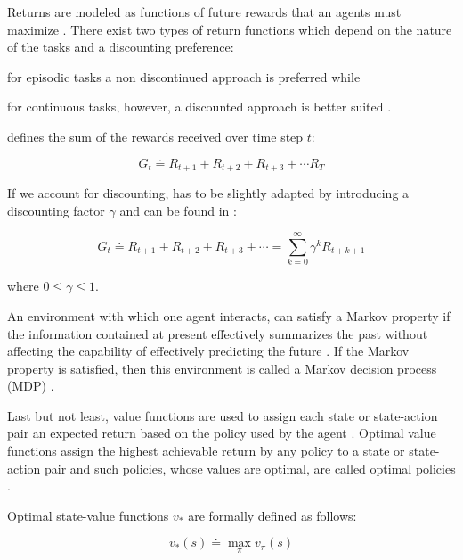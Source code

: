 \documentclass{seal_thesis}
\begin{document}
Returns are modeled as functions of future rewards that an agents must maximize \cite[p. 73]{Sutton2017}. There exist two types of return functions which depend on the nature of the tasks and a discounting preference:
\begin{enumerate*}
	\item for episodic tasks a non discontinued approach is preferred while
	\item for continuous tasks, however, a discounted approach is better suited \cite[p. 73]{Sutton2017}.
\end{enumerate*}

 defines the sum of the rewards received over time step $t$:

\begin{equation}
\label{eq:expected_return}
	G_t  \doteq R_{t+1} + R_{t+2} + R_{t+3} + \cdots R_{T}
\end{equation}

If we account for discounting,  has to be slightly adapted by introducing a discounting factor $\gamma$ and can be found in :

\begin{equation}
\label{eq:expected_discounted_return}
	G_t  \doteq R_{t+1} + R_{t+2} + R_{t+3} + \cdots = \sum_{k=0}^\infty \gamma^k R_{t+k+1}
\end{equation}

where $0 \leq \gamma \leq 1$.

An environment  with which one agent interacts, can satisfy a Markov property if the information contained at present effectively summarizes the past without affecting the capability of effectively predicting the future \cite[p. 73]{Sutton2017}. If the Markov property is satisfied, then this environment is called a Markov decision process (MDP) \cite[p. 73]{Sutton2017}.

Last but not least, value functions are used to assign each state or state-action pair an expected return based on the policy used by the agent \cite[p. 74]{Sutton2017}. Optimal value functions assign the highest achievable return by any policy to a state or state-action pair  and such policies, whose values are optimal, are called optimal policies \cite[p. 74]{Sutton2017}.

Optimal state-value functions $v_*$ are formally defined as follows:

\begin{equation}
	v_* (s) \doteq \max_\pi v_\pi (s)
\end{equation}
\end{document}
